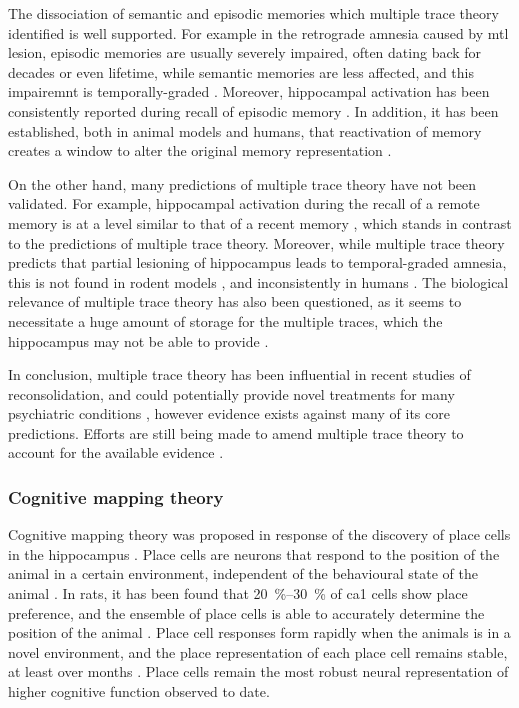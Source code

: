 The dissociation of semantic and episodic memories which multiple trace theory identified is well supported. For example in the retrograde amnesia caused by \gls{mtl} lesion, episodic memories are usually severely impaired, often dating back for decades or even lifetime, while semantic memories are less affected, and this impairemnt is temporally-graded \citep{kapur97, vargha-khadem97, moscovitch05}. Moreover, hippocampal activation has been consistently reported during recall of episodic memory \citep{maguire01, svoboda06}. In addition, it has been established, both in animal models and humans, that reactivation of memory creates a window to alter the original memory representation \citep{wang10, dunbar16}.

On the other hand, many predictions of multiple trace theory have not been validated. For example, hippocampal activation during the recall of a remote memory is at a level similar to that of a recent memory \citep{addis04, steinvorth06, wheeler13}, which stands in contrast to the predictions of multiple trace theory. Moreover, while multiple trace theory predicts that partial lesioning of hippocampus leads to temporal-graded amnesia, this is not found in rodent models \citep{sutherland10}, and inconsistently in humans \citep{yassa13}. The biological relevance of multiple trace theory has also been questioned, as it seems to necessitate a huge amount of storage for the multiple traces, which the hippocampus may not be able to provide \citep{yassa13}. 

In conclusion, multiple trace theory has been influential in recent studies of reconsolidation, and could potentially provide novel treatments for many psychiatric conditions \citep{dunbar16}, however evidence exists against many of its core predictions. Efforts are still being made to amend multiple trace theory to account for the available evidence \citep{moscovitch05, yassa13}.

\subsubsection{Cognitive mapping theory \label{hpc-spatial}}
Cognitive mapping theory was proposed in response of the discovery of place cells in the hippocampus \citep{o'keefe71, o'keefe78}. Place cells are neurons that respond to the position of the animal in a certain environment, independent of the behavioural state of the animal \citep{o'keefe78}. In rats, it has been found that \SIrange{20}{30}{\percent} of \gls{ca1} cells show place preference, and the ensemble of place cells is able to accurately determine the position of the animal \citep{guzowski99, o'keefe05, ziv13}. Place cell responses form rapidly when the animals is in a novel environment, and the place representation of each place cell remains stable, at least over months \citep{wilson93, ziv13}. Place cells remain the most robust neural representation of higher cognitive function observed to date.

